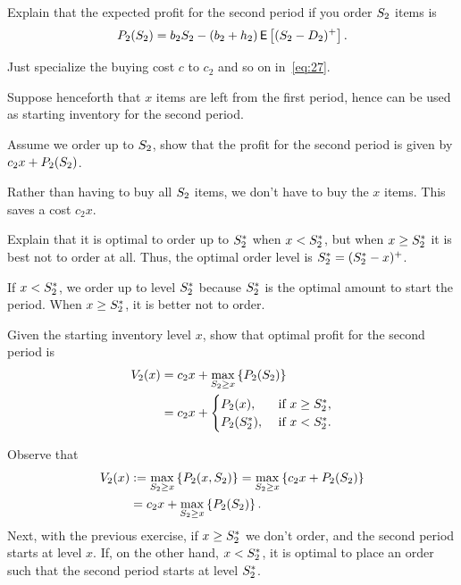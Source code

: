 \begin{exercise}
Explain that the  expected profit for the second period if you order $S_2$ items is
\begin{align}\label{eq:28}
P_2(S_2) = b_2 S_2 - (b_2+h_2)\,\mathsf{E}\left[(S_2-D_2)^+\right].
\end{align}
\begin{solution}
Just specialize the buying cost $c$ to $c_2$ and so on in~\eqref{eq:27}.
\end{solution}
\end{exercise}

Suppose henceforth that $x$ items are left from the first period, hence can be used as starting inventory for the second period.
  
\begin{exercise}
Assume we order up to $S_2$,  show that the profit for the second period is given by
$c_2 x + P_2(S_2)$.
\begin{solution}
Rather than having to buy all $S_2$ items, we don't have to buy the $x$ items. This saves a cost $c_2 x$. 
\end{solution}
\end{exercise}

\begin{exercise}
Explain that it is optimal to order up to $S_2^*$ when $x<S_2^*$, but when $x\geq 
S_2^*$ it is best not to order at all. Thus, the optimal order level is $S_2^* = (S_2^* - x)^+$.  
\begin{solution}
If $x<S_2^*$, we order up to level $S_2^*$ because $S_2^*$ is the optimal amount to start the period. When $x\geq S_2^*$, it is better not to order. 
\end{solution}
\end{exercise}

\begin{exercise}
Given the starting inventory level $x$, show that optimal profit  for the second period is
\begin{align}\label{eq:24}
V_2(x) & = c_2x + \max_{S_2\geq x} \left\{P_2(S_2)\right\} \notag \\
&= c_2x +
  \begin{cases}
    P_2(x), &\text{ if } x\geq S_2^*, \\
    P_2(S_2^*), &\text{ if } x<S_2^*.
  \end{cases}
\end{align}
\begin{solution} Observe that
\begin{align*}
V_2(x) 
&:=\max_{S_2\geq x} \left\{P_2(x,S_2)\right\} 
= \max_{S_2\geq x} \left\{c_2x + P_2(S_2)\right\} \\
& = c_2x + \max_{S_2\geq x} \left\{P_2(S_2)\right\}.
\end{align*}
Next, with the previous exercise, if $x\geq S_2^*$ we don't order, and the second period starts at level $x$. If, on the other hand, $x<S_2^*$, it is optimal to place an order such that the second period starts at level $S_2^*$.
\end{solution}
\end{exercise}

